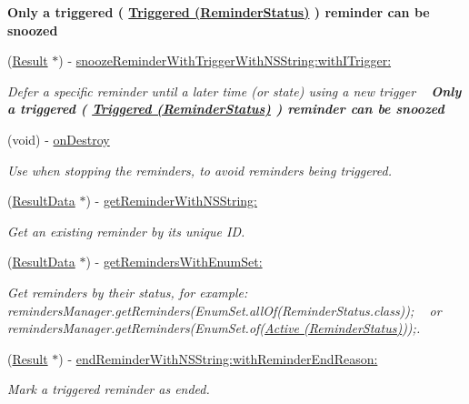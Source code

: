 \begin{DoxyCompactItemize}
\begin{DoxyCompactList}
 {\bfseries Only a triggered ( \hyperlink{interface_reminder_status_a0589243c8a680fa3f44bc5a73db22681}{Triggered (\+Reminder\+Status)} ) reminder can be snoozed} \end{DoxyCompactList}\item 
(\hyperlink{interface_result}{Result} $\ast$) -\/ \hyperlink{protocol_i_reminders_manager-p_a50b3d369f5a9fc60f120ade8542be115}{snooze\+Reminder\+With\+Trigger\+With\+N\+S\+String\+:with\+I\+Trigger\+:}
\begin{DoxyCompactList}\small\item\em Defer a specific reminder until a later time (or state) using a new trigger ~\newline
 {\bfseries Only a triggered ( \hyperlink{interface_reminder_status_a0589243c8a680fa3f44bc5a73db22681}{Triggered (\+Reminder\+Status)} ) reminder can be snoozed} \end{DoxyCompactList}\item 
(void) -\/ \hyperlink{protocol_i_reminders_manager-p_a7473bc1afcac2a0a4b0b488b66efd60b}{on\+Destroy}
\begin{DoxyCompactList}\small\item\em Use when stopping the reminders, to avoid reminders being triggered. \end{DoxyCompactList}\item 
(\hyperlink{interface_result_data}{Result\+Data} $\ast$) -\/ \hyperlink{protocol_i_reminders_manager-p_a1e4824e9847ec4e4e524dda3f464a434}{get\+Reminder\+With\+N\+S\+String\+:}
\begin{DoxyCompactList}\small\item\em Get an existing reminder by its unique I\+D. \end{DoxyCompactList}\item 
(\hyperlink{interface_result_data}{Result\+Data} $\ast$) -\/ \hyperlink{protocol_i_reminders_manager-p_ac10b5d4bc09407bf9d12bf61cf83698c}{get\+Reminders\+With\+Enum\+Set\+:}
\begin{DoxyCompactList}\small\item\em Get reminders by their status, for example\+: ~\newline
 reminders\+Manager.\+get\+Reminders(Enum\+Set.\+all\+Of(Reminder\+Status.\+class)); ~\newline
 or ~\newline
 reminders\+Manager.\+get\+Reminders(Enum\+Set.\+of(\hyperlink{interface_reminder_status_a687076acfbd106692b1a784a0782e2af}{Active (\+Reminder\+Status)}));. \end{DoxyCompactList}\item 
(\hyperlink{interface_result}{Result} $\ast$) -\/ \hyperlink{protocol_i_reminders_manager-p_aa4a3b2c0dc6e7f087af388f4c3c7186d}{end\+Reminder\+With\+N\+S\+String\+:with\+Reminder\+End\+Reason\+:}
\begin{DoxyCompactList}\small\item\em Mark a triggered reminder as ended. \end{DoxyCompactList}\end{DoxyCompactItemize}


